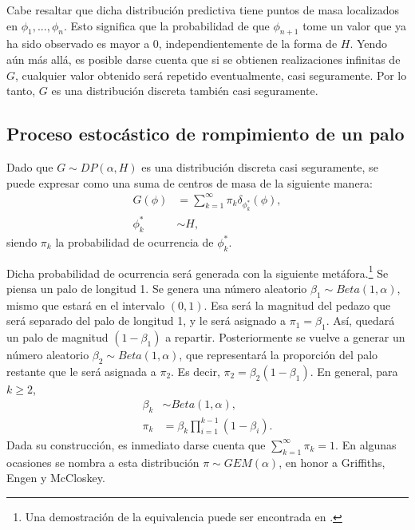 Cabe resaltar que dicha distribuci\'on predictiva tiene puntos de masa localizados en $\phi_1,...,\phi_n$. Esto significa que la probabilidad de que $\phi_{n+1}$ tome un valor que ya ha sido observado es mayor a $0$, independientemente de la forma de $H$. Yendo a\'un m\'as all\'a, es posible darse cuenta que si se obtienen realizaciones infinitas de $G$, cualquier valor obtenido ser\'a repetido eventualmente, casi seguramente. Por lo tanto, $G$ es una distribuci\'on discreta tambi\'en casi seguramente.

\subsection{Proceso estoc\'astico de rompimiento de un palo}

Dado que $G \sim DP(\alpha,H)$  es una distribuci\'on discreta casi seguramente, se puede expresar como una suma de centros de masa de la siguiente manera:
\begin{equation*}
\begin{aligned}
G(\phi) &= \sum_{k=1}^\infty \pi_k \delta_{\phi_k^*}(\phi),\\
   \phi_k^* &\sim H,
\end{aligned}
\end{equation*}
siendo $\pi_k$ la probabilidad de ocurrencia de $\phi_k^*$.

Dicha probabilidad de ocurrencia ser\'a generada con la siguiente met\'afora.\footnote{Una demostraci\'on de la equivalencia puede ser encontrada en \cite{Paisley_SB}.} Se piensa un palo de longitud 1. Se genera una n\'umero aleatorio $\beta_1 \sim Beta(1,\alpha)$, mismo que estar\'a en el intervalo $(0,1)$. Esa ser\'a la magnitud del pedazo que ser\'a separado del palo de longitud 1, y le ser\'a asignado a $\pi_1 = \beta_1$. As\'i, quedar\'a un palo de magnitud $(1-\beta_1)$ a repartir. Posteriormente se vuelve a generar un n\'umero aleatorio $\beta_2 \sim Beta(1,\alpha)$, que representar\'a la proporci\'on del palo restante que le ser\'a asignada a $\pi_2$. Es decir, $\pi_2 = \beta_2(1-\beta_1)$. En general, para $k \geq 2$,
\begin{equation*}
\begin{aligned}
   \beta_k &\sim Beta(1,\alpha),\\
   \pi_k &= \beta_k \prod_{i=1}^{k-1}(1 - \beta_i).
\end{aligned}
\end{equation*}
Dada su construcci\'on, es inmediato darse cuenta que $\sum_{k=1}^\infty \pi_k = 1$. En algunas ocasiones se nombra a esta distribuci\'on $\pi \sim GEM(\alpha)$, en honor a Griffiths, Engen y McCloskey.

